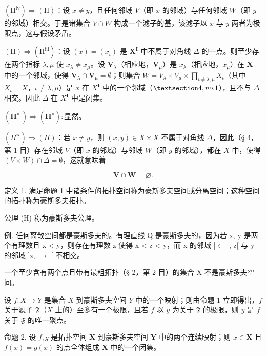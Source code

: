 \((\mathrm{H}^{\mathrm{iv}}) \Longrightarrow (\mathrm{H})\)：设 \(x \neq y\)，且任何邻域 \(V\)（即 \(x\) 的邻域）与任何邻域 \(W\)（即 \(y\) 的邻域）相交。于是诸集合 \(V \cap W\) 构成一个滤子的基，该滤子以 \(x\) 与 \(y\) 两者为极限点，这与假设矛盾。

\((\mathrm{H}) \Longrightarrow (\mathrm{H}^{\mathrm{iii}})\)：设 \((x) = (x_{\iota})\) 是 \(\mathbf{X}^{\mathbf{I}}\) 中不属于对角线 \(\Delta\) 的一点。则至少存在两个指标 \(\lambda, \mu\) 使 \(x_{\lambda} \neq x_{\mu}\)。设 \(\mathbf{V}_{\lambda}\)（相应地，\(\mathbf{V}_{\mu}\)）是 \(x_{\lambda}\)（相应地，\(x_{\mu}\)）在 \(\mathbf{X}\) 中的一个邻域，使得 \(\mathbf{V}_{\lambda} \cap \mathbf{V}_{\mu} = \emptyset\)；则集合 \(W = V_{\lambda} \times V_{\mu} \times \prod_{\iota \neq \lambda, \mu} X_{\iota}\)（其中 \(X_{\iota} = X\)，\(\iota \neq \lambda, \mu\)）是 \(x\) 在 \(X^{\mathbf{I}}\) 中的一个邻域（\(\S 4, no.1\)），且不与 \(\Delta\) 相交。因此 \(\Delta\) 在 \(X^{\mathbf{I}}\) 中是闭集。

\((\mathbf{H}^{\mathrm{iii}}) \Rightarrow (\mathbf{H}^{\mathrm{ii}}): \text{显然。}\)

\((H^{ii}) \Longrightarrow (H)\)：若 \(x \neq y\)，则 \((x, y) \in X \times X\) 不属于对角线 \(\Delta\)，因此（§ 4，第 1 目）存在邻域 \(V\)（即 \(x\) 的邻域）与邻域 \(W\)（即 \(y\) 的邻域），都在 \(X\) 中，使得 \((V \times W) \cap \Delta = \emptyset\)，这就意味着

\[
\mathbf {V} \cap \mathbf {W} = \varnothing .
\]

定义 1. 满足命题 1 中诸条件的拓扑空间称为豪斯多夫空间或分离空间；这种空间的拓扑称为豪斯多夫拓扑。

公理 (H) 称为豪斯多夫公理。

例. 任何离散空间都是豪斯多夫的。有理直线 Q 是豪斯多夫的，因为若 x, y 是两个有理数且 x \textless{} y，则存在有理数 z 使得 x \textless{} z \textless{} y，而 x 的邻域 {]}\(\leftarrow\) , z{[} 与 y 的邻域 {]}z, \(\rightarrow\) {[} 不相交。

一个至少含有两个点且带有最粗拓扑（§ 2，第 2 目）的集合 X 不是豪斯多夫空间。

设 \(f: X \to Y\) 是集合 \(X\) 到豪斯多夫空间 \(Y\) 中的一个映射；则由命题 1 立即得出，\(f\) 关于滤子 \(\mathfrak{F}\)（\(X\) 上的）至多有一个极限，且若 \(f\) 以 \(y\) 为关于 \(\mathfrak{F}\) 的极限，则 \(y\) 是 \(f\) 关于 \(\mathfrak{F}\) 的唯一聚点。

命题 2. 设 \(f, g\) 是拓扑空间 \(\mathbf{X}\) 到豪斯多夫空间 \(\mathbf{Y}\) 中的两个连续映射；则 \(x \in \mathbf{X}\) 且 \(f(x) = g(x)\) 的点全体组成 \(\mathbf{X}\) 中的一个闭集。

